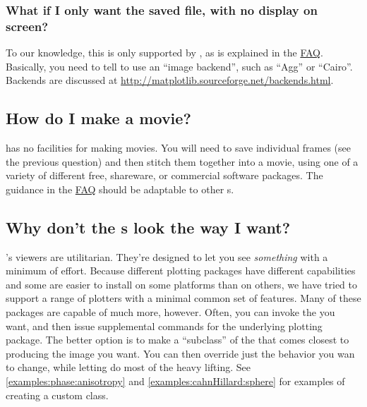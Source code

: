         \subsubsection{What if I only want the saved file, with no
        display on screen?} To our knowledge, this is only supported
        by \Matplotlib{}, as is explained in the
        \href{http://matplotlib.sourceforge.net/faq/howto_faq.html#generate-images-without-having-a-window-popup}{\Matplotlib{}
        FAQ}. Basically, you need to tell \Matplotlib{} to use an
        ``image backend'', such as ``Agg'' or ``Cairo''. Backends are
        discussed at
        \url{http://matplotlib.sourceforge.net/backends.html}.
        

    \subsection{How do I make a movie?} \FiPy{} has no facilities for 
    making movies. You will need to save individual frames (see the 
    previous question) and then stitch them together into a movie, 
    using one of a variety of different free, shareware, or 
    commercial software packages. The guidance in the 
    \href{http://matplotlib.sourceforge.net/faq/howto_faq.html#make-a-movie}{\Matplotlib{}
    FAQ} should be adaptable to other s.
    
    \subsection{Why don't the s look the way I want?}
    \FiPy's viewers are utilitarian. They're designed to let you see 
    \emph{something} with a minimum of effort. Because different 
    plotting packages have different capabilities and some are easier 
    to install on some platforms than on others, we have tried to 
    support a range of \Python{} plotters with a minimal common set of 
    features. Many of these packages are capable of much more, 
    however. Often, you can invoke the  you want, and 
    then issue supplemental commands for the underlying plotting 
    package. The better option is to make a ``subclass'' of the 
    \FiPy{}  that comes closest to producing the image 
    you want. You can then override just the behavior you wan to 
    change, while letting \FiPy{} do most of the heavy lifting. See 
    \ref{examples:phase:anisotropy} and 
    \ref{examples:cahnHillard:sphere} for examples of creating a custom 
    \Matplotlib{}  class.
    
